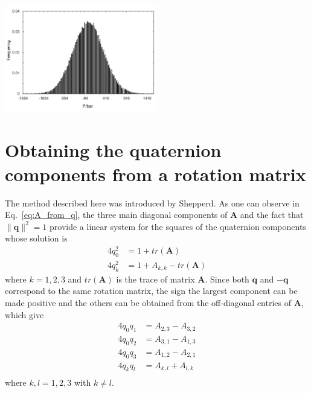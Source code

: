 \documentclass[aip,jcp,reprint,amsmath,amssymb,raggedbottom]{revtex4-1}
\newcommand{\mt}[1]{\boldsymbol{\mathbf{#1}}}           %
\newcommand{\vt}[1]{\boldsymbol{\mathbf{#1}}}           %
\begin{document}
\begin{center}
\label{fig:pressure}
\includegraphics[width=0.5\textwidth,keepaspectratio]{FiguraAna}
\end{center}

\appendix

\section{\label{sec:quat_from_A}Obtaining the quaternion components from a rotation matrix}

The method described here was introduced by Shepperd.\cite{Shepperd1978} As one can observe in Eq.~\ref{eq:A_from_q}, the three main diagonal components of $\mt A$ and the fact that $\lVert \vt q \lVert^2 = 1$ provide a linear system for the squares of the quaternion components whose solution is
\begin{align*}
4 q_0^2 &= 1 + tr(\mt A) \\
4 q_k^2 &= 1 + A_{k,k} - tr(\mt A)
\end{align*}
where $k = 1,2,3$ and $tr(\mt A)$ is the trace of matrix $\mt A$. Since both $\vt q$ and $- \vt q$ correspond to the same rotation matrix, the sign the largest component\cite{Shepperd1978} can be made positive and the others can be obtained from the off-diagonal entries of $\mt A$, which give
\begin{align*}
4 q_0 q_1 &= A_{2,3} - A_{3,2} \\
4 q_0 q_2 &= A_{3,1} - A_{1,3} \\
4 q_0 q_3 &= A_{1,2} - A_{2,1} \\
4 q_k q_l &= A_{k,l} + A_{l,k} \\
\end{align*}
where $k,l = 1,2,3$ with $k \neq l$.
\end{document}
